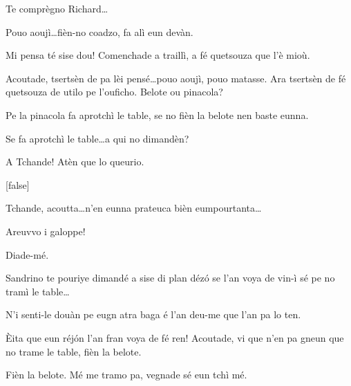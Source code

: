 \begin{drama}
\Gerominespeaks{} Te comprègno Richard\ldots

\Richardspeaks Pouo aoujì\ldots fièn-no coadzo, fa alì eun devàn.

\Tuenospeaks Mi pensa té sise dou! Comenchade a traillì, a fé quetsouza que l'è mioù.


\Richardspeaks  Acoutade, tsertsèn de pa lèi pensé\ldots pouo aoujì, pouo matasse. Ara tsertsèn de fé quetsouza de utilo pe l'ouficho.  Belote ou pinacola?


\Gerominespeaks Pe la pinacola fa aprotchì le table, se no fièn la belote nen baste eunna.


\Saventaspeaks Se fa aprotchì le table\ldots a qui no dimandèn? 

\Tuenospeaks A Tchande! Atèn que lo queurio.


[false]\label{tel}


\Tuenospeaks Tchande, acoutta\ldots n'en eunna prateuca bièn eumpourtanta\ldots

\Sandrinospeaks Areuvvo i galoppe!


\Sandrinospeaks Diade-mé.

\Gerominespeaks Sandrino te pouriye dimandé a sise di plan déz\'o se l'an voya de vin-ì sé pe no tramì le table\ldots

\Sandrinospeaks N'i senti-le douàn pe eugn atra baga é l'an deu-me que l'an pa lo ten.


\Richardspeaks \`Eita que eun réj\'on l'an fran voya de fé ren! Acoutade, vi que n'en pa gneun que no trame le table, fièn la belote.

\Tuenospeaks Fièn la belote. Mé me tramo pa, vegnade sé eun tchì mé.



\end{drama}

